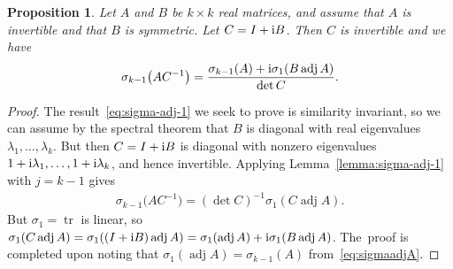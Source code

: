 \documentclass[pdftex]{sigma}
\def\adj{\operatorname{adj}}
\def\tr{\operatorname{tr}}
\newtheorem{Proposition}[Theorem]{Proposition}
\numberwithin{equation}{section}
\begin{document}
\begin{Proposition} \label{prop:sigma-adj-1}
Let $A$ and $B$ be $k \times k$ \emph{real} matrices, and assume that $A$ is invertible and that $B$ is symmetric. Let $C = I + {\rm i} B$. Then $C$ is invertible and we have
\begin{gather} \label{eq:sigma-adj-1}
\sigma_{k-1} \big(AC^{-1}\big) = \frac{\sigma_{k-1} (A) + {\rm i} \sigma_1 (B \adj A)}{\det C}.
\end{gather}
\end{Proposition}
\begin{proof}
The result~\eqref{eq:sigma-adj-1} we seek to prove is similarity invariant, so we can assume by the spectral theorem that $B$ is diagonal with real eigenvalues $\lambda_1, \dots, \lambda_k$. But then $C = I + {\rm i} B$ is diagonal with nonzero eigenvalues $1 + {\rm i} \lambda_1, \dots, 1 + {\rm i} \lambda_k$, and hence invertible. Applying Lemma~\ref{lemma:sigma-adj-1} with $j = k-1$ gives
\begin{gather*}
\sigma_{k-1} \big(A C^{-1}\big) = (\det C)^{-1} \sigma_1 (C \adj A).
\end{gather*}
But $\sigma_1 = \tr$ is linear, so $\sigma_1 (C \adj A) = \sigma_1 ( (I + {\rm i} B) \adj A) = \sigma_1 (\adj A) + {\rm i} \sigma_1 (B \adj A)$. The~proof is completed upon noting that $\sigma_1 (\adj A) = \sigma_{k-1} (A)$ from~\eqref{eq:sigmaadjA}.
\end{proof}
\end{document}
